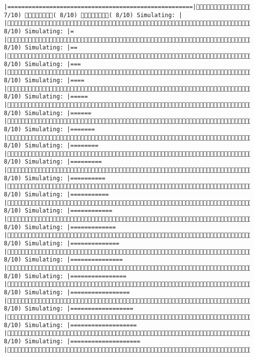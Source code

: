 \documentclass[]{article}
\begin{document}
\begin{verbatim}
|=====================================================|( 7/10) ( 8/10) ( 8/10) Simulating: |                                                     |( 8/10) Simulating: |=                                                    |( 8/10) Simulating: |==                                                   |( 8/10) Simulating: |===                                                  |( 8/10) Simulating: |====                                                 |( 8/10) Simulating: |=====                                                |( 8/10) Simulating: |======                                               |( 8/10) Simulating: |=======                                              |( 8/10) Simulating: |========                                             |( 8/10) Simulating: |=========                                            |( 8/10) Simulating: |==========                                           |( 8/10) Simulating: |===========                                          |( 8/10) Simulating: |============                                         |( 8/10) Simulating: |=============                                        |( 8/10) Simulating: |==============                                       |( 8/10) Simulating: |===============                                      |( 8/10) Simulating: |================                                     |( 8/10) Simulating: |=================                                    |( 8/10) Simulating: |==================                                   |( 8/10) Simulating: |===================                                  |( 8/10) Simulating: |====================                                 |( 
\end{verbatim}
\end{document}
